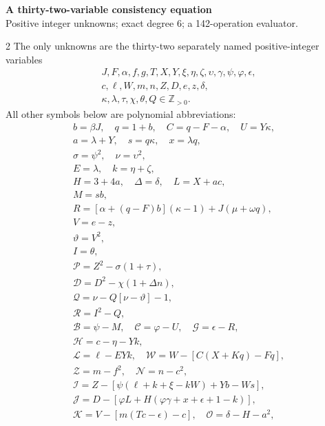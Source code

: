 \documentclass[10pt]{article}
\begin{document}
\begin{center}
{\large\bfseries A thirty-two-variable consistency equation}\\[-1pt]
{\small Positive integer unknowns; exact degree 6; a 142-operation evaluator.}
\end{center}\vspace{-8pt}
\begin{multicols}{2}
\fontsize{8.6}{9.1}\selectfont
The only unknowns are the thirty-two separately named positive-integer variables
\[
\begin{gathered}J,F,\alpha,f,g,T,X,Y,\xi,\eta,\zeta,\upsilon,\gamma,\psi,\varphi,\epsilon,\\
c,\ell,W,m,n,Z,D,e,z,\delta,\\
\kappa,\lambda,\tau,\chi,\theta,Q\in\mathbb Z_{>0}.\end{gathered}
\]
All other symbols below are polynomial abbreviations:
\[
\begin{gathered}
b=\beta J,\quad q=1+b,\quad C=q-F-\alpha,\quad U=Y\kappa,\\
a=\lambda+Y,\quad s=q\kappa,\quad x=\lambda q,\\
\sigma=\psi^2,\quad\nu=\upsilon^2,\\
E=\lambda,\quad k=\eta+\zeta,\\
H=3+4a,\quad\Delta=\delta,\quad L=X+ac,\\
M=sb,\\
R=[\alpha+(q-F)b](\kappa-1)+J(\mu+\omega q),\\
V=e-z,\\
\vartheta=V^2,\\
I=\theta,\\
\mathcal{P}=Z^2-\sigma(1+\tau),\\
\mathcal{D}=D^2-\chi(1+\Delta n),\\
\mathcal{Q}=\nu-Q[\nu-\vartheta]-1,\\
\mathcal{R}=I^2-Q,\\
\mathcal{B}=\psi-M,\quad \mathcal{C}=\varphi-U,\quad \mathcal{G}=\epsilon-R,\\
\mathcal{H}=c-\eta-Yk,\\
\mathcal{L}=\ell-EYk,\quad \mathcal{W}=W-[C(X+Kq)-Fq],\\
\mathcal{Z}=m-f^2,\quad \mathcal{N}=n-c^2,\\
\mathcal{I}=Z-[\psi(\ell+k+\xi-kW)+Yb-Ws],\\
\mathcal{J}=D-[\varphi L+H(\varphi\gamma+x+\epsilon+1-k)],\\
\mathcal{K}=V-[m(Tc-\epsilon)-c],\quad\mathcal{O}=\delta-H-a^2,\\

\end{gathered}\]
\end{multicols}
\end{document}
